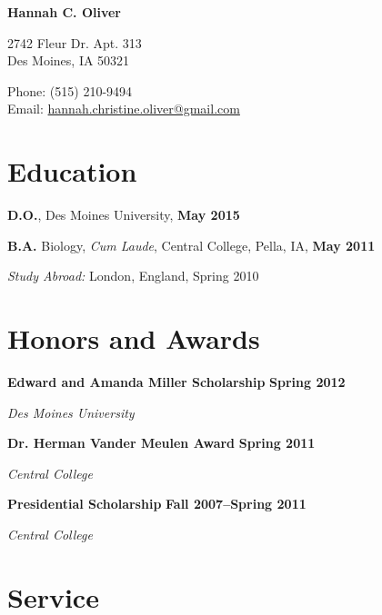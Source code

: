 \documentclass[10pt,letterpaper]{article}
\def\name{Hannah C. Oliver}
\renewenvironment{itemize}{
  \begin{list}{}{
      \setlength{\leftmargin}{1.5em}
      \setlength{\itemsep}{0.25em}
      \setlength{\parskip}{0pt}
      \setlength{\parsep}{0.25em}
    }
  }{
  \end{list}
}
\newcommand{\yearrange}[1]{\hfill \textbf{#1} \par}
\begin{document}

\centerline{\huge \bf \name}

\bigskip

\begin{minipage}[t]{0.5\textwidth}
  2742 Fleur Dr. Apt. 313 \\
  Des Moines, IA 50321
\end{minipage}
\begin{minipage}[t]{0.5\textwidth}
  Phone: (515) 210-9494 \\
  Email: \href{mailto:hannah.christine.oliver@gmail.com}{hannah.christine.oliver@gmail.com}
\end{minipage}

\section*{Education}

\begin{itemize}
\item \textbf{D.O.}, Des Moines University, \yearrange{May 2015}
\item \textbf{B.A.} Biology, \textit{Cum Laude}, Central
  College, Pella, IA, \yearrange{May 2011}
  \begin{itemize} 
  \item \textit{Study Abroad:} London, England, Spring 2010
  \end{itemize}
\end{itemize}

\section*{Honors and Awards}
\begin{itemize}
\item \textbf{Edward and Amanda Miller Scholarship} \yearrange{Spring 2012}
  \textit{Des Moines University}
\item \textbf{Dr. Herman Vander Meulen Award} \yearrange{Spring 2011}
  \textit{Central College}
\item \textbf{Presidential Scholarship} \yearrange{Fall 2007--Spring 2011}
  \textit{Central College}
\end{itemize}

\section*{Service}
\end{document}
